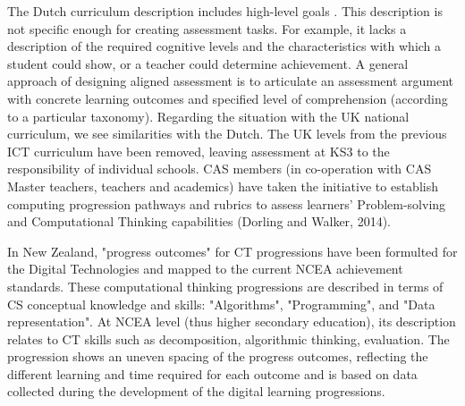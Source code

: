 The Dutch curriculum description includes high-level goals \cite{Barendsen2016}. This description is not specific enough for creating assessment tasks. For example, it lacks a description of the required cognitive levels and the characteristics with which a student could show, or a teacher could determine achievement. A general approach of designing aligned assessment is to articulate an assessment argument with concrete learning outcomes and specified level of comprehension (according to a particular taxonomy)\cite{biggs1996}. Regarding the situation with the UK national curriculum, we see similarities with the Dutch. The UK levels from the previous ICT curriculum have been removed, leaving assessment at KS3 to the responsibility of individual schools. CAS members (in co-operation with CAS Master teachers, teachers and academics) have taken the initiative to establish computing progression pathways and rubrics to assess learners' Problem-solving and Computational Thinking capabilities (Dorling and Walker, 2014).


In New Zealand, "progress outcomes" for CT progressions have been formulted for the Digital Technologies and mapped to the current NCEA achievement standards. These computational thinking progressions are described in terms of CS conceptual knowledge and skills: "Algorithms", "Programming", and "Data representation". At NCEA level (thus higher secondary education), its description relates to CT skills such as decomposition, algorithmic thinking, evaluation. The progression shows an uneven spacing of the progress outcomes, reflecting the different learning and time required for each outcome and is based on data collected during the development of the digital learning progressions.

%
%


